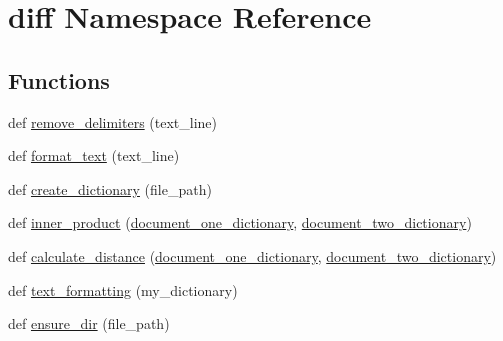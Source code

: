\hypertarget{namespacediff}{}\section{diff Namespace Reference}
\label{namespacediff}
\subsection*{Functions}
\begin{DoxyCompactItemize}
\item 
def \hyperlink{namespacediff_af60a451d448d916b5326b02f0c96147e}{remove\+\_\+delimiters} (text\+\_\+line)
\item 
def \hyperlink{namespacediff_a17722e85e83540a4710fa571f274e460}{format\+\_\+text} (text\+\_\+line)
\item 
def \hyperlink{namespacediff_af7396fb95b2a175d067c1c73c75c49f6}{create\+\_\+dictionary} (file\+\_\+path)
\item 
def \hyperlink{namespacediff_a3a1a3f01a48273670935a0fc45b8975f}{inner\+\_\+product} (\hyperlink{namespacediff_aa4da046a613de2dafe03d105bca31694}{document\+\_\+one\+\_\+dictionary}, \hyperlink{namespacediff_a00ac707250a54a82a970c2bb2acf736a}{document\+\_\+two\+\_\+dictionary})
\item 
def \hyperlink{namespacediff_a0b1fc82894743728455b31d3e9ec3671}{calculate\+\_\+distance} (\hyperlink{namespacediff_aa4da046a613de2dafe03d105bca31694}{document\+\_\+one\+\_\+dictionary}, \hyperlink{namespacediff_a00ac707250a54a82a970c2bb2acf736a}{document\+\_\+two\+\_\+dictionary})
\item 
def \hyperlink{namespacediff_aa2e19dbdbb5368eafd04b0cfe58c59a9}{text\+\_\+formatting} (my\+\_\+dictionary)
\item 
def \hyperlink{namespacediff_ac7ecd54dde7759dd5569ffb765995278}{ensure\+\_\+dir} (file\+\_\+path)
\end{DoxyCompactItemize}
